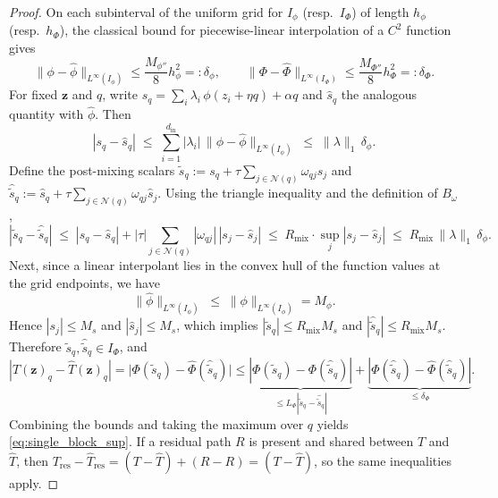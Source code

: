 \documentclass[10pt,a4paper]{amsart}
\begin{document}
\begin{proof}
On each subinterval of the uniform grid for $I_\phi$ (resp.\ $I_\Phi$) of length $h_\phi$ (resp.\ $h_\Phi$), the classical bound for piecewise-linear interpolation of a $C^2$ function gives
$$\|\phi-\hat\phi\|_{L^\infty(I_\phi)}\le \frac{M_{\phi''}}{8}h_\phi^2=:\delta_\phi,
\qquad
\|\Phi-\hat\Phi\|_{L^\infty(I_\Phi)}\le \frac{M_{\Phi''}}{8}h_\Phi^2=:\delta_\Phi.$$
For fixed $\mathbf{z}$ and $q$, write $s_q=\sum_i\lambda_i\,\phi(z_i+\eta q)+\alpha q$ and $\hat s_q$ the analogous quantity with $\hat\phi$. Then
$$|s_q-\hat s_q|\;\le\;\sum_{i=1}^{d_{\mathrm{in}}}|\lambda_i|\,\|\phi-\hat\phi\|_{L^\infty(I_\phi)}
\;\le\;\|\lambda\|_{1}\,\delta_\phi.$$
Define the post-mixing scalars $\tilde s_q:=s_q+\tau\sum_{j\in\mathcal{N}(q)}\omega_{qj}s_j$ and $\hat{\tilde s}_q:=\hat s_q+\tau\sum_{j\in\mathcal{N}(q)}\omega_{qj}\hat s_j$. Using the triangle inequality and the definition of $B_\omega$,
$$|\tilde s_q-\hat{\tilde s}_q|
\;\le\;
|s_q-\hat s_q| + |\tau| \sum_{j\in\mathcal{N}(q)}|\omega_{qj}|\,|s_j-\hat s_j|
\;\le\; R_{\mathrm{mix}}\cdot \sup_{j}|s_j-\hat s_j|
\;\le\; R_{\mathrm{mix}}\,\|\lambda\|_{1}\,\delta_\phi.$$
Next, since a linear interpolant lies in the convex hull of the function values at the grid endpoints, we have
$$\|\hat\phi\|_{L^\infty(I_\phi)} \;\le\; \|\phi\|_{L^\infty(I_\phi)}=M_\phi.$$
Hence $|s_j|\le M_s$ and $|\hat s_j|\le M_s$, which implies $|\tilde s_q|\le R_{\mathrm{mix}}M_s$ and $|\hat{\tilde s}_q|\le R_{\mathrm{mix}}M_s$. Therefore $\tilde s_q,\hat{\tilde s}_q\in I_\Phi$, and
$$|T(\mathbf{z})_q-\hat T(\mathbf{z})_q|
=\bigl|\Phi(\tilde s_q)-\hat\Phi(\hat{\tilde s}_q)\bigr|
\le \underbrace{|\Phi(\tilde s_q)-\Phi(\hat{\tilde s}_q)|}_{\le L_\Phi |\tilde s_q-\hat{\tilde s}_q|}
+ \underbrace{|\Phi(\hat{\tilde s}_q)-\hat\Phi(\hat{\tilde s}_q)|}_{\le \delta_\Phi}.$$
Combining the bounds and taking the maximum over $q$ yields \eqref{eq:single_block_sup}. If a residual path $R$ is present and shared between $T$ and $\hat T$, then $T_{\mathrm{res}}-\hat T_{\mathrm{res}}=(T-\hat T)+(R-R)=(T-\hat T)$, so the same inequalities apply.
\end{proof}
\end{document}
